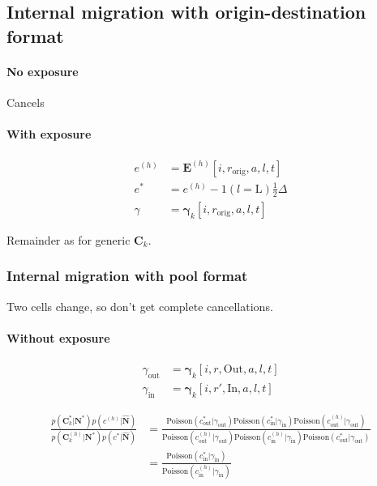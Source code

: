 \documentclass{article}
\begin{document}
\subsection{Internal migration with origin-destination format}

\paragraph{No exposure}

Cancels

\paragraph{With exposure}

\begin{align}
  e^{(h)} & = \bm{E}^{(h)}[i, r_{\text{orig}}, a, l, t] \\
  e^* & = e^{(h)} - 1(l = \text{L}) \tfrac{1}{2} \Delta \\
  \gamma & = \bm{\gamma}_k[i, r_{\text{orig}}, a, l, t]
\end{align}

Remainder as for generic $\bm{C}_k$.



\subsubsection{Internal migration with pool format}

Two cells change, so don't get complete cancellations.

\paragraph{Without exposure}

\begin{align}
  \gamma_{\text{out}} & = \bm{\gamma}_k[i, r, \text{Out}, a, l, t] \\
  \gamma_{\text{in}} & = \bm{\gamma}_k[i, r', \text{In}, a, l, t]
\end{align}

\begin{align}
\frac{p(\bm{C}_k^* | \bm{N}^*) p(c^{(h)} | \hat{\bm{N}})  }{p(\bm{C}_k^{(h)} | \bm{N}^*) p(c^* | \hat{\bm{N}}) } 
  & = \frac{ \text{Poisson}\left( c_{\text{out}}^* | \gamma_{\text{out}} \right) \text{Poisson}\left( c_{\text{in}}^* | \gamma_{\text{in}} \right) \text{Poisson}\left( c_{\text{out}}^{(h)} | \gamma_{\text{out}} \right) }{ \text{Poisson}\left( c_{\text{out}}^{(h)} | \gamma_{\text{out}} \right) \text{Poisson}\left( c_{\text{in}}^{(h)} | \gamma_{\text{in}} \right) \text{Poisson}\left( c_{\text{out}}^* | \gamma_{\text{out}} \right) } \\
  & = \frac{ \text{Poisson}\left( c_{\text{in}}^* | \gamma_{\text{in}} \right)  }{ \text{Poisson}\left( c_{\text{in}}^{(h)} | \gamma_{\text{in}} \right )}
\end{align}
\end{document}
